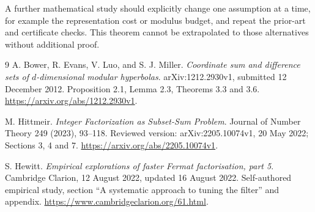 \documentclass[11pt]{article}
\begin{document}
A further mathematical study should explicitly change one assumption at
a time, for example the representation cost or modulus budget, and repeat
the prior-art and certificate checks. This theorem cannot be extrapolated
to those alternatives without additional proof.

\begin{thebibliography}{9}
 A. Bower, R. Evans, V. Luo, and S. J. Miller.
\emph{Coordinate sum and difference sets of $d$-dimensional modular
hyperbolas}. arXiv:1212.2930v1, submitted 12 December 2012.
Proposition 2.1, Lemma 2.3, Theorems 3.3 and 3.6.
\url{https://arxiv.org/abs/1212.2930v1}.

 M. Hittmeir. \emph{Integer Factorization as Subset-Sum
Problem}. Journal of Number Theory 249 (2023), 93--118.
Reviewed version: arXiv:2205.10074v1, 20 May 2022; Sections 3, 4 and 7.
\url{https://arxiv.org/abs/2205.10074v1}.

 S. Hewitt. \emph{Empirical explorations of faster Fermat
factorisation, part 5}. Cambridge Clarion, 12 August 2022, updated
16 August 2022. Self-authored empirical study, section ``A systematic
approach to tuning the filter'' and appendix.
\url{https://www.cambridgeclarion.org/61.html}.
\end{thebibliography}
\end{document}

